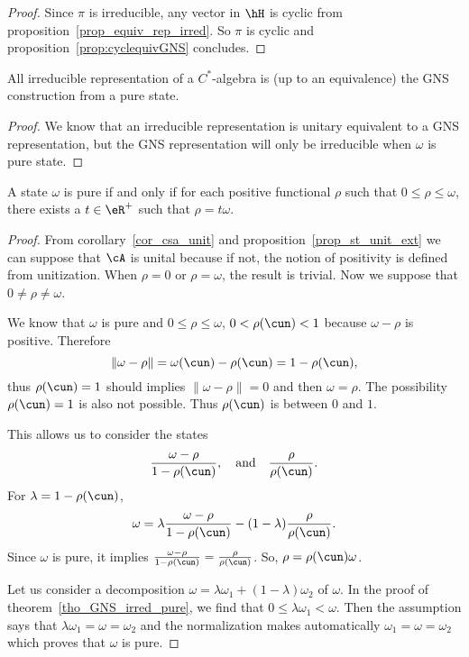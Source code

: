 \begin{proof}
	Since $\pi$ is irreducible, any vector in $\hH$ is cyclic from proposition~\ref{prop_equiv_rep_irred}. So $\pi$ is cyclic and proposition~\ref{prop:cyclequivGNS} concludes.

\end{proof}

\begin{corollary}
	All irreducible representation of a $C^*$-algebra is (up to an equivalence) the GNS construction from a pure state.
\end{corollary}


\begin{proof}
	We know that an irreducible representation is unitary equivalent to a GNS representation, but the GNS representation will only be irreducible when $\omega$ is pure state.
\end{proof}


\begin{proposition}
	A state $\omega$ is pure if and only if for each positive functional $\rho$ such that $0\leq \rho\leq\omega$, there exists a $t\in\eR^+$ such that $\rho=t\omega$.
	\label{prop_pureiff}
\end{proposition}

\begin{proof}
	From corollary~\ref{cor_csa_unit} and  proposition~\ref{prop_st_unit_ext} we can suppose that $\cA$ is unital because if not, the notion of positivity is defined from unitization. When $\rho=0$ or $\rho=\omega$, the result is trivial. Now we suppose that $0\neq\rho\neq\omega$.


	We know that $\omega$ is pure and $0\leq\rho\leq\omega$, $0<\rho(\cun)<1$ because $\omega-\rho$ is positive. Therefore
	\[
		\| \omega-\rho \|=\omega(\cun)-\rho(\cun)=1-\rho(\cun),
	\]
	thus $\rho(\cun)=1$ should implies $\| \omega-\rho \|=0$ and then $\omega=\rho$. The possibility $\rho(\cun)=1$ is also not possible. Thus $\rho(\cun)$ is between $0$ and $1$.

	This allows us to consider the states
	\[
		\frac{ \omega-\rho }{ 1-\rho(\cun) },\quad\text{and}\quad\frac{ \rho }{ \rho(\cun) }.
	\]
	For $\lambda=1-\rho(\cun)$,
	\[
		\omega=\lambda\frac{ \omega-\rho }{ 1-\rho(\cun) }-(1-\lambda)\frac{ \rho }{ \rho(\cun) }.
	\]
	Since $\omega$ is pure, it implies $\frac{ \omega-\rho }{ 1-\rho(\cun) }=\frac{ \rho }{ \rho(\cun) }$. So, $\rho=\rho(\cun)\omega$.


	Let us consider a decomposition $\omega=\lambda\omega_1+(1-\lambda)\omega_2$ of $\omega$. In the proof of theorem~\ref{tho_GNS_irred_pure}, we find that $0\leq\lambda\omega_1<\omega$. Then the assumption says that $\lambda\omega_1=\omega=\omega_2$ and the normalization makes automatically $\omega_1=\omega=\omega_2$ which proves that $\omega$ is pure.

\end{proof}


